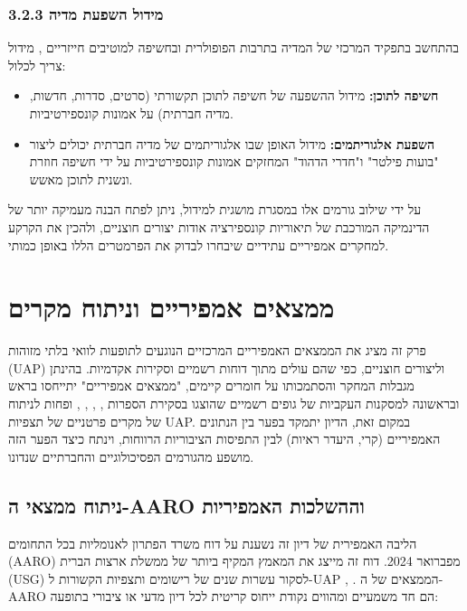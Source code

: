 \documentclass[12pt,a4paper]{article}
\begin{document}
\subsubsection*{3.2.3 מידול השפעת מדיה}
בהתחשב בתפקיד המרכזי של המדיה בתרבות הפופולרית ובחשיפה למוטיבים חייזריים \cite{wojcik2021cosmologies}, מידול צריך לכלול:
\begin{itemize}
    \item \textbf{חשיפה לתוכן:} מידול ההשפעה של חשיפה לתוכן תקשורתי (סרטים, סדרות, חדשות, מדיה חברתית) על אמונות קונספירטיביות.
    \item \textbf{השפעת אלגוריתמים:} מידול האופן שבו אלגוריתמים של מדיה חברתית יכולים ליצור "בועות פילטר" ו"חדרי הדהוד" המחזקים אמונות קונספירטיביות על ידי חשיפה חוזרת ונשנית לתוכן מאשש.
\end{itemize}
על ידי שילוב גורמים אלו במסגרת מושגית למידול, ניתן לפתח הבנה מעמיקה יותר של הדינמיקה המורכבת של תיאוריות קונספירציה אודות יצורים חוצניים, ולהכין את הקרקע למחקרים אמפיריים עתידיים שיבחרו לבדוק את הפרמטרים הללו באופן כמותי.

\section{ממצאים אמפיריים וניתוח מקרים}

פרק זה מציג את הממצאים האמפיריים המרכזיים הנוגעים לתופעות לוואי בלתי מזוהות (UAP) וליצורים חוצניים, כפי שהם עולים מתוך דוחות רשמיים וסקירות אקדמיות. בהינתן מגבלות המחקר והסתמכותו על חומרים קיימים, "ממצאים אמפיריים" יתייחסו בראש ובראשונה למסקנות העקביות של גופים רשמיים שהוצגו בסקירת הספרות \cite{aaro2024misidentification}, \cite{aaro2024noevidence}, \cite{wojcik2021cosmologies}, \cite{bowes2023conspiracy, biddlestone2025conspiracy, ellwood1999ufo}, ופחות לניתוח של מקרים פרטניים של תצפיות UAP. במקום זאת, הדיון יתמקד בפער בין הנתונים האמפיריים (קרי, היעדר ראיות) לבין התפיסות הציבוריות הרווחות, וינתח כיצד הפער הזה מושפע מהגורמים הפסיכולוגיים והחברתיים שנדונו.

\subsection{ניתוח ממצאי ה-AARO וההשלכות האמפיריות}

הליבה האמפירית של דיון זה נשענת על דוח משרד הפתרון לאנומליות בכל התחומים (AARO) מפברואר 2024. דוח זה מייצג את המאמץ המקיף ביותר של ממשלת ארצות הברית (USG) לסקור עשרות שנים של רישומים ותצפיות הקשורות ל-UAP \cite{aaro2024misidentification}, \cite{aaro2024noevidence}. הממצאים של ה-AARO הם חד משמעיים ומהווים נקודת ייחוס קריטית לכל דיון מדעי או ציבורי בתופעה:
\end{document}
